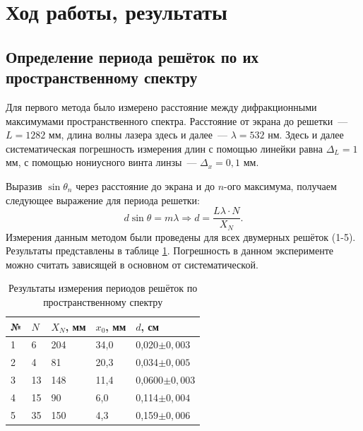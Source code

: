 \section{Ход работы, результаты}\label{sectionref}

\subsection{Определение периода решёток по их пространственному спектру}
Для первого метода было измерено расстояние между дифракционными максимумами пространственного спектра. Расстояние от экрана до решетки~--- $L = 1282 \text{ мм}$, длина волны лазера здесь и далее~--- $\lambda = 532 \text{ нм}$. Здесь и далее систематическая погрешность измерения длин с помощью линейки равна $\Delta_L = 1$ мм, с помощью нониусного винта линзы~--- $\Delta_x = 0,1$ мм. 

Выразив $\sin\theta_n$ через расстояние до экрана и до $n$-ого максимума, получаем следующее выражение для периода решетки:
\[
d \sin \theta = m \lambda \Longrightarrow d = \frac{L \lambda \cdot N}{X_N}.
\]
Измерения данным методом были проведены для всех двумерных решёток (1-5). Результаты представлены в таблице \ref{tab1}. Погрешность в данном эксперименте можно считать зависящей в основном от систематической. 

\begin{table}[!ht]
    \centering
    \begin{tabular}{|l|l|l|l|l|}
    \hline
        № & $N$ & $X_N$, мм & $x_0$, мм & $d$, см \\ \hline
        1 & 6 & 204 & 34,0 & 0,020$\pm0,003$ \\ \hline
        2 & 4 & 81 & 20,3 & 0,034$\pm0,005$ \\ \hline
        3 & 13 & 148 & 11,4 & 0,0600$\pm0,003$ \\ \hline
        4 & 15 & 90 & 6,0 & 0,114$\pm0,004$ \\ \hline
        5 & 35 & 150 & 4,3 & 0,159$\pm0,006$ \\ \hline
    \end{tabular}
    \caption{Результаты измерения периодов решёток по пространственному спектру}
    \label{tab1}
\end{table}

